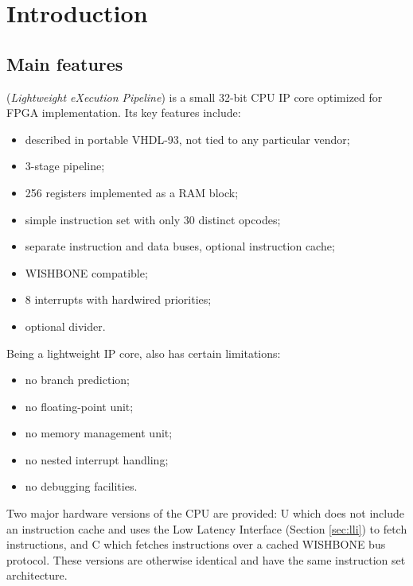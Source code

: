\documentclass[a4paper,12pt,twoside,extrafontsizes]{memoir}
\begin{document}


\mainmatter

\chapter{Introduction}

\section{Main features}

\lxp{} (\emph{Lightweight eXecution Pipeline}) is a small 32-bit CPU IP core optimized for FPGA implementation. Its key features include:

\begin{itemize}
	\item described in portable VHDL-93, not tied to any particular vendor;
	\item 3-stage pipeline;
	\item 256 registers implemented as a RAM block;
	\item simple instruction set with only 30 distinct opcodes;
	\item separate instruction and data buses, optional instruction cache;
	\item WISHBONE compatible;
	\item 8 interrupts with hardwired priorities;
	\item optional divider.
\end{itemize}

Being a lightweight IP core, \lxp{} also has certain limitations:

\begin{itemize}
	\item no branch prediction;
	\item no floating-point unit;
	\item no memory management unit;
	\item no nested interrupt handling;
	\item no debugging facilities.
\end{itemize}

Two major hardware versions of the CPU are provided: \lxp{}U which does not include an instruction cache and uses the Low Latency Interface (Section \ref{sec:lli}) to fetch instructions, and \lxp{}C which fetches instructions over a cached WISHBONE bus protocol. These versions are otherwise identical and have the same instruction set architecture.
\end{document}
